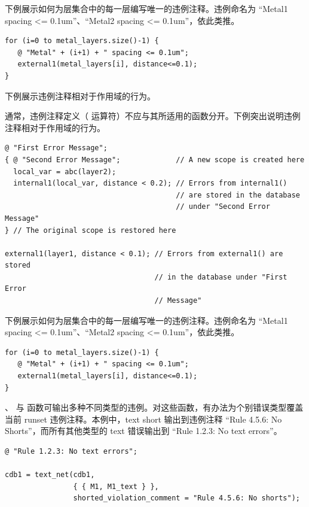下例展示如何为层集合中的每一层编写唯一的违例注释。违例命名为 ``Metal1 spacing <= 0.1um''、``Metal2 spacing <= 0.1um''，依此类推。
\begin{lstlisting}[style=pxl]
for (i=0 to metal_layers.size()-1) {
   @ "Metal" + (i+1) + " spacing <= 0.1um";
   external1(metal_layers[i], distance<=0.1);
}
\end{lstlisting}

下例展示违例注释相对于作用域的行为。

\begin{noteBox}
通常，违例注释定义（ 运算符）不应与其所适用的函数分开。下例突出说明违例注释相对于作用域的行为。
\end{noteBox}

\begin{lstlisting}[style=pxl]
@ "First Error Message";
{ @ "Second Error Message";             // A new scope is created here
  local_var = abc(layer2);
  internal1(local_var, distance < 0.2); // Errors from internal1()
                                        // are stored in the database
                                        // under "Second Error Message"
} // The original scope is restored here

external1(layer1, distance < 0.1); // Errors from external1() are stored
                                   // in the database under "First Error
                                   // Message"
\end{lstlisting}

下例展示如何为层集合中的每一层编写唯一的违例注释。违例命名为 ``Metal1 spacing <= 0.1um''、``Metal2 spacing <= 0.1um''，依此类推。
\begin{lstlisting}[style=pxl]
for (i=0 to metal_layers.size()-1) {
   @ "Metal" + (i+1) + " spacing <= 0.1um";
   external1(metal_layers[i], distance<=0.1);
}
\end{lstlisting}

、 与  函数可输出多种不同类型的违例。对这些函数，有办法为个别错误类型覆盖当前 runset 违例注释。本例中，text short 输出到违例注释 ``Rule 4.5.6: No Shorts''，而所有其他类型的 text 错误输出到 ``Rule 1.2.3: No text errors''。
\begin{lstlisting}[style=pxl]
@ "Rule 1.2.3: No text errors";

cdb1 = text_net(cdb1,
                { { M1, M1_text } },
                shorted_violation_comment = "Rule 4.5.6: No shorts");
\end{lstlisting}

